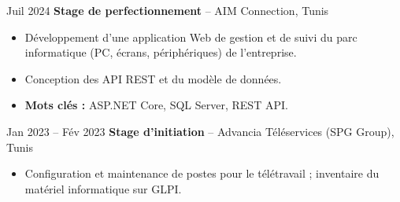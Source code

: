     \begin{twocolentry}{
            Juil 2024
        }
            \textbf{Stage de perfectionnement }-- AIM Connection, Tunis
    \end{twocolentry}
    \vspace{-0.1cm}
        \begin{itemize}[label=\textbullet,left=0.3cm]
            \item Développement d'une application Web de gestion et de suivi du parc informatique (PC, écrans, périphériques) de l'entreprise.
            \vspace{-0.1cm}
            \item Conception des API REST et du modèle de données.
            \vspace{-0.1cm}
            \item \textbf{Mots clés :} ASP.NET Core, SQL Server, REST API.
        \end{itemize}

    \begin{twocolentry}{
            Jan 2023 -- Fév 2023
        }
            \textbf{Stage d'initiation }-- Advancia Téléservices (SPG Group), Tunis
    \end{twocolentry}
    \vspace{-0.1cm}
        \begin{itemize}[label=\textbullet,left=0.3cm]
            \item Configuration et maintenance de postes pour le télétravail ; inventaire du matériel informatique sur GLPI.
        \end{itemize}
